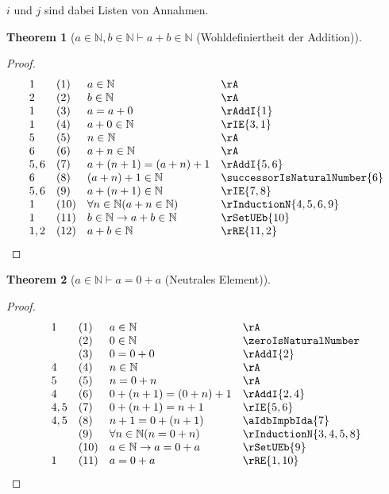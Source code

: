 \documentclass{book}
\theoremstyle{plain}
\newtheorem{theorem}{Theorem}
\theoremstyle{remark}
\theoremstyle{definition}
\begin{document}
\(i\) und \(j\) sind dabei Listen von Annahmen.

\label{aInNaturalwbInNaturalImpaPlusbInNatural}
\begin{theorem}[\(a\in\mathbb{N}, b\in\mathbb{N}\vdash a+b\in\mathbb{N}\) (Wohldefiniertheit der Addition)]
\end{theorem}
\begin{proof}
	\[
	\begin{array}{llll}
		1   &  (1) & a\in\mathbb{N} & \rA \\
            2   &  (2) & b\in\mathbb{N} & \rA \\
            1   &  (3) & a=a+0 & \rAddI{1} \\
            1   &  (4) & a+0\in\mathbb{N} & \rIE{3,1} \\
            5   &  (5) & n\in \mathbb{N} & \rA \\
            6   &  (6) & a+n\in \mathbb{N} & \rA \\
            5,6 &  (7) & a+(n+1)=(a+n)+1 & \rAddI{5,6} \\
            6   &  (8) & (a+n)+1\in\mathbb{N} & \successorIsNaturalNumber{6} \\
            5,6 &  (9) & a+(n+1)\in\mathbb{N} & \rIE{7,8} \\
            1   &  (10) & \forall n\in\mathbb{N}(a+n\in\mathbb{N}) & \rInductionN{4,5,6,9} \\
            1   &  (11) & b\in\mathbb{N}\rightarrow a+b\in\mathbb{N} & \rSetUEb{10} \\
            1,2 &  (12) & a+b\in\mathbb{N} & \rRE{11,2} \\
	\end{array}
	\]
\end{proof}

\label{aInNaturalImpaEqualsZeroPlusa}
\begin{theorem}[\(a\in\mathbb{N}\vdash a=0+a\) (Neutrales Element)]
\end{theorem}
\begin{proof}
        \[
	\begin{array}{llll}
            1   &  (1) & a\in\mathbb{N} & \rA \\
                &  (2) & 0\in\mathbb{N} & \zeroIsNaturalNumber \\
                &  (3) & 0=0+0 & \rAddI{2} \\
            4   &  (4) & n\in\mathbb{N} & \rA \\
            5   &  (5) & n=0+n & \rA \\
            4   &  (6) & 0+(n+1)=(0+n)+1 & \rAddI{2,4} \\
            4,5 &  (7) & 0+(n+1)=n+1 & \rIE{5,6} \\
            4,5 &  (8) & n+1=0+(n+1) & \aIdbImpbIda{7} \\
                &  (9) & \forall n\in\mathbb{N}(n=0+n) & \rInductionN{3,4,5,8} \\
                &  (10) & a\in\mathbb{N}\rightarrow a=0+a & \rSetUEb{9} \\
            1   &  (11) & a=0+a & \rRE{1,10} \\
	\end{array}
	\]
\end{proof}
\end{document}
